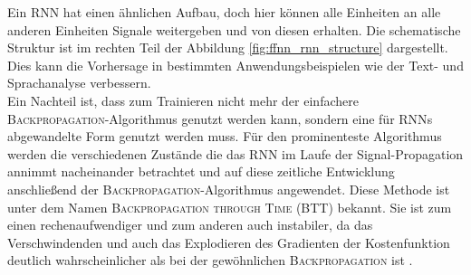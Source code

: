 Ein \textsc{RNN} hat einen ähnlichen Aufbau, doch hier können alle Einheiten an alle anderen Einheiten Signale weitergeben und von diesen erhalten. Die schematische Struktur ist im rechten Teil der Abbildung \ref{fig:ffnn_rnn_structure} dargestellt. Dies kann die Vorhersage in bestimmten Anwendungsbeispielen wie der Text- und Sprachanalyse verbessern.\\
Ein Nachteil ist, dass zum Trainieren nicht mehr der einfachere \textsc{Backpropagation}-Algorithmus genutzt werden kann, sondern eine für \textsc{RNN}s abgewandelte Form genutzt werden muss. Für den prominenteste Algorithmus werden die verschiedenen Zustände die das \textsc{RNN} im Laufe der Signal-Propagation annimmt nacheinander betrachtet und auf diese zeitliche Entwicklung anschließend der \textsc{Backpropagation}-Algorithmus angewendet. Diese Methode ist unter dem Namen \textsc{Backpropagation through Time} (BTT) bekannt. Sie ist zum einen rechenaufwendiger und zum anderen auch instabiler, da das Verschwindenden und auch das Explodieren des Gradienten der Kostenfunktion deutlich wahrscheinlicher als bei der gewöhnlichen \textsc{Backpropagation} ist \citep{pascanu, jeagerTut2002}.

